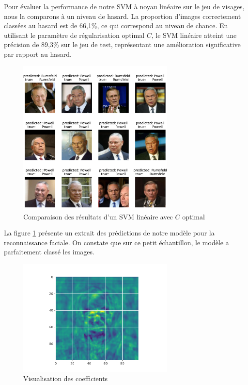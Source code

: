 \documentclass[a4paper,12pt]{article}
\begin{document}
Pour évaluer la performance de notre SVM à noyau linéaire sur le jeu de visages, nous la comparons à un niveau de hasard. La proportion d’images correctement classées au hasard est de 66,1\%, ce qui correspond au niveau de chance. En utilisant le paramètre de régularisation optimal $C$, le SVM linéaire atteint une précision de 89,3\% sur le jeu de test, représentant une amélioration significative par rapport au hasard.\\ 

\begin{figure}[H] 
    \centering
    \includegraphics[width=0.7\textwidth]{images/predict_true_annexe.pdf} 
    \caption{Comparaison des résultats d’un SVM linéaire avec $C$ optimal}
    \label{fig:predict_true_ann}
\end{figure}

La figure \ref{fig:predict_true_ann} présente un extrait des prédictions de notre modèle pour la reconnaissance faciale. On constate que sur ce petit échantillon, le modèle a parfaitement classé les images.

\begin{figure}[H] 
    \centering
    \includegraphics[width=0.7\textwidth]{images/coeffs_annexe.pdf} 
    \caption{Visualisation des coefficients}
    \label{fig:coeffs_annexe}
\end{figure}
\end{document}

